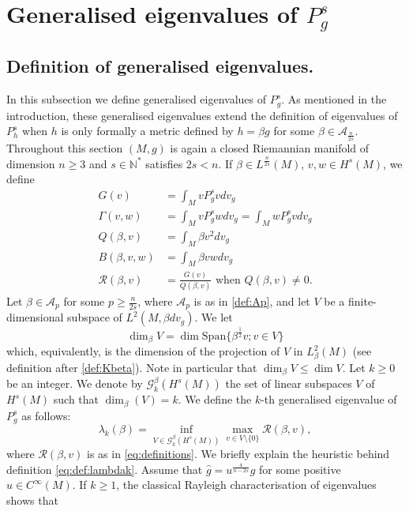 \documentclass[10pt]{amsart}
\numberwithin{equation}{section}
\def\be{{\beta}}
\theoremstyle{plain}
\theoremstyle{remark}
\begin{document}
\section{Generalised eigenvalues of $P_g^s$} \label{generalised_eigen} \label{sec:defvp}


\subsection{Definition of generalised eigenvalues.} In this subsection we define generalised eigenvalues of $P_g^s$. As mentioned in the introduction, these generalised eigenvalues extend the definition of eigenvalues of $P_h^s$ when $h$ is only formally a metric defined by $h = \beta g$ for some $\beta \in \mathcal{A}_{\frac{n}{2s}}$. Throughout this section $(M,g)$ is again a closed Riemannian manifold of dimension $n \ge 3$ and $s \in \mathbb{N}^*$ satisfies $2s <n$. 
If $\be \in L^{\frac{n}{2s}}(M)$,  $v,w \in H^s(M)$, we define
\begin{equation} \label{eq:definitions}
\begin{aligned}
 G(v) & = \int_M  v P^s_g v dv_g   \\
 \Gamma(v,w) &= \int_M  v P^s_g w dv_g = \int_M  w P^s_g v dv_g \\
  Q(\beta,v) & = \int_M \beta v^2 dv_g  \\
B(\beta,v,w) &= \int_M \beta v w dv_g  \\
 \mathcal{R}(\beta,v) & =  \frac{G(v)}{Q(\beta,v)} \text{ when } Q(\beta,v) \neq 0.
\end{aligned} \end{equation}
Let $\beta \in \mathcal{A}_p$ for some $p \ge \frac{n}{2s}$, where $\mathcal{A}_{p}$ is as in \eqref{def:Ap}, and let $V$ be a finite-dimensional subspace of $L^2(M, \beta dv_g)$. We let 
$$ \dim_\beta V = \dim \text{Span} \{ \beta^{\frac{1}{2}}v ; v \in V \} $$
which, equivalently, is the dimension of the projection of $V$ in $L^2_\beta(M)$ (see definition after \eqref{def:Kbeta}). Note in particular that $\dim_{\beta} V \le \dim V$. Let $k \geq 0$ be an integer. We denote by $\mathcal{G}_k^\beta(H^s(M))$ the set of linear subspaces $V$ of $H^s(M)$ such that $\dim_\beta(V) = k$. We define the $k$-th generalised eigenvalue of $P_g^s$ as follows: 
\begin{equation} \label{eq:def:lambdak}
 \lambda_k(\beta)= \inf_{V \in \mathcal{G}_k^\beta(H^s(M))} \max_{v\in V\setminus \{0\}}  \mathcal{R}(\beta,v),
 \end{equation}
 where $\mathcal{R}(\beta,v)$ is as in \eqref{eq:definitions}. We briefly explain the heuristic behind definition \eqref{eq:def:lambdak}. Assume that $\hat{g} = u^{\frac{4}{n-2s}}g$ for some positive $u \in C^\infty(M)$. If $k \ge 1$, the classical Rayleigh characterisation of eigenvalues shows that 
\end{document}
